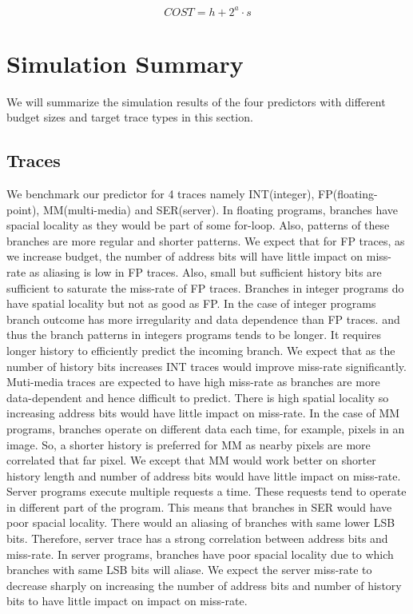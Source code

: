 \documentclass[conference]{IEEEtran}
\begin{document}
    \begin{equation}
    COST = h + 2^a \cdot s
    \end{equation}
\section{Simulation Summary}
We will summarize the simulation results of the four predictors with different budget sizes and target trace types in this section.
\subsection{Traces}
We benchmark our predictor for 4 traces namely INT(integer), FP(floating-point), MM(multi-media) and SER(server). In floating programs, branches have spacial locality as they would be part of some for-loop. Also, patterns of these branches are more regular and shorter patterns. We expect that for FP traces, as we increase budget, the number of address bits will have little impact on miss-rate as aliasing is low in FP traces. Also, small but sufficient history bits are sufficient to saturate the miss-rate of FP traces. Branches in integer programs do have spatial locality but not as good as FP. In the case of integer programs branch outcome has more irregularity and data dependence than FP traces.  and thus the branch patterns in integers programs tends to be longer. It requires longer history to efficiently predict the incoming branch. We expect that as the number of history bits increases INT traces would improve miss-rate significantly. Muti-media traces are expected to have high miss-rate as branches are more data-dependent and hence difficult to predict. There is high spatial locality so increasing address bits would have little impact on miss-rate. In the case of MM programs, branches operate on different data each time, for example, pixels in an image. So, a shorter history is preferred for MM as nearby pixels are more correlated that far pixel. We except that MM would work better on shorter history length and number of address bits would have little impact on miss-rate. Server programs execute multiple requests a time. These requests tend to operate in different part of the program. This means that branches in SER would have poor spacial locality. There would an aliasing of branches with same lower LSB bits. Therefore, server trace has a strong correlation between address bits and miss-rate.  In server programs, branches have poor spacial locality due to which branches with same LSB bits will aliase. We expect the server miss-rate to decrease sharply on increasing the number of address bits and number of history bits to have little impact on impact on miss-rate.
\end{document}
